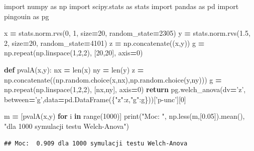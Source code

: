 \documentclass[polish,]{book}
\newenvironment{Shaded}{\begin{snugshade}}{\end{snugshade}}
\newcommand{\BuiltInTok}[1]{#1}
\newcommand{\ControlFlowTok}[1]{\textcolor[rgb]{0.13,0.29,0.53}{\textbf{#1}}}
\newcommand{\DecValTok}[1]{\textcolor[rgb]{0.00,0.00,0.81}{#1}}
\newcommand{\FloatTok}[1]{\textcolor[rgb]{0.00,0.00,0.81}{#1}}
\newcommand{\ImportTok}[1]{#1}
\newcommand{\KeywordTok}[1]{\textcolor[rgb]{0.13,0.29,0.53}{\textbf{#1}}}
\newcommand{\NormalTok}[1]{#1}
\newcommand{\OperatorTok}[1]{\textcolor[rgb]{0.81,0.36,0.00}{\textbf{#1}}}
\newcommand{\StringTok}[1]{\textcolor[rgb]{0.31,0.60,0.02}{#1}}
\begin{document}
\begin{Shaded}
\begin{Highlighting}[]
\ImportTok{import}\NormalTok{ numpy }\ImportTok{as}\NormalTok{ np}
\ImportTok{import}\NormalTok{ scipy.stats }\ImportTok{as}\NormalTok{ stats}
\ImportTok{import}\NormalTok{ pandas }\ImportTok{as}\NormalTok{ pd}
\ImportTok{import}\NormalTok{ pingouin }\ImportTok{as}\NormalTok{ pg}

\NormalTok{x }\OperatorTok{=}\NormalTok{ stats.norm.rvs(}\DecValTok{0}\NormalTok{, }\DecValTok{1}\NormalTok{, size}\OperatorTok{=}\DecValTok{20}\NormalTok{, random_state}\OperatorTok{=}\DecValTok{2305}\NormalTok{)}
\NormalTok{y }\OperatorTok{=}\NormalTok{ stats.norm.rvs(}\FloatTok{1.5}\NormalTok{, }\DecValTok{2}\NormalTok{, size}\OperatorTok{=}\DecValTok{20}\NormalTok{, random_state}\OperatorTok{=}\DecValTok{4101}\NormalTok{)}
\NormalTok{z }\OperatorTok{=}\NormalTok{ np.concatenate((x,y))}
\NormalTok{g }\OperatorTok{=}\NormalTok{ np.repeat(np.linspace(}\DecValTok{1}\NormalTok{,}\DecValTok{2}\NormalTok{,}\DecValTok{2}\NormalTok{), [}\DecValTok{20}\NormalTok{,}\DecValTok{20}\NormalTok{], axis}\OperatorTok{=}\DecValTok{0}\NormalTok{)}
  
\KeywordTok{def}\NormalTok{ pvalA(x,y):}
\NormalTok{    nx }\OperatorTok{=} \BuiltInTok{len}\NormalTok{(x)}
\NormalTok{    ny }\OperatorTok{=} \BuiltInTok{len}\NormalTok{(y)}
\NormalTok{    z }\OperatorTok{=}\NormalTok{ np.concatenate((np.random.choice(x,nx),np.random.choice(y,ny)))}
\NormalTok{    g }\OperatorTok{=}\NormalTok{ np.repeat(np.linspace(}\DecValTok{1}\NormalTok{,}\DecValTok{2}\NormalTok{,}\DecValTok{2}\NormalTok{), [nx,ny], axis}\OperatorTok{=}\DecValTok{0}\NormalTok{)}
    \ControlFlowTok{return}\NormalTok{ pg.welch_anova(dv}\OperatorTok{=}\StringTok{'z'}\NormalTok{, between}\OperatorTok{=}\StringTok{'g'}\NormalTok{,data}\OperatorTok{=}\NormalTok{pd.DataFrame(\{}\StringTok{"z"}\NormalTok{:z,}\StringTok{"g"}\NormalTok{:g\}))[}\StringTok{'p-unc'}\NormalTok{][}\DecValTok{0}\NormalTok{]}

\NormalTok{m }\OperatorTok{=}\NormalTok{ [pvalA(x,y) }\ControlFlowTok{for}\NormalTok{ i }\KeywordTok{in} \BuiltInTok{range}\NormalTok{(}\DecValTok{1000}\NormalTok{)]}
\BuiltInTok{print}\NormalTok{(}\StringTok{"Moc: "}\NormalTok{, np.less(m,[}\FloatTok{0.05}\NormalTok{]).mean(), }\StringTok{"dla 1000 symulacji testu Welch-Anova"}\NormalTok{)}
\end{Highlighting}
\end{Shaded}

\begin{verbatim}
## Moc:  0.909 dla 1000 symulacji testu Welch-Anova
\end{verbatim}
\end{document}
